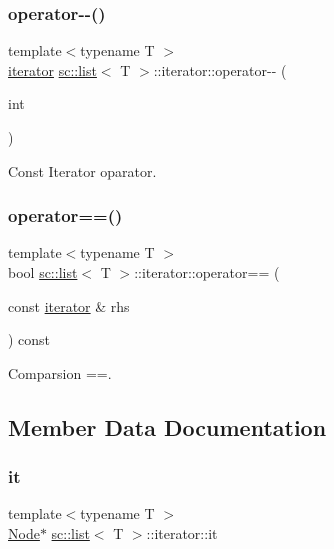 \subsubsection{\texorpdfstring{operator-\/-\/()}{operator--()}\hspace{0.1cm}{\footnotesize\ttfamily [2/2]}}
{\footnotesize\ttfamily template$<$typename T $>$ \\
\hyperlink{classsc_1_1list_1_1iterator}{iterator} \hyperlink{classsc_1_1list}{sc\+::list}$<$ T $>$\+::iterator\+::operator-\/-\/ (\begin{DoxyParamCaption}\item[{int}]{ }\end{DoxyParamCaption})\hspace{0.3cm}{\ttfamily [inline]}}



Const Iterator oparator. 

\mbox{\label{classsc_1_1list_1_1iterator_a26eaacd8583e5d26a65cd6f6ef31f2bb}} 
\subsubsection{\texorpdfstring{operator==()}{operator==()}}
{\footnotesize\ttfamily template$<$typename T $>$ \\
bool \hyperlink{classsc_1_1list}{sc\+::list}$<$ T $>$\+::iterator\+::operator== (\begin{DoxyParamCaption}\item[{const \hyperlink{classsc_1_1list_1_1iterator}{iterator} \&}]{rhs }\end{DoxyParamCaption}) const\hspace{0.3cm}{\ttfamily [inline]}}



Comparsion ==. 



\subsection{Member Data Documentation}
\mbox{\label{classsc_1_1list_1_1iterator_aea61cc70ea3b0c69e1e7eee809bf4cef}} 
\subsubsection{\texorpdfstring{it}{it}}
{\footnotesize\ttfamily template$<$typename T $>$ \\
\hyperlink{structsc_1_1list_1_1_node}{Node}$\ast$ \hyperlink{classsc_1_1list}{sc\+::list}$<$ T $>$\+::iterator\+::it\hspace{0.3cm}{\ttfamily [private]}}

